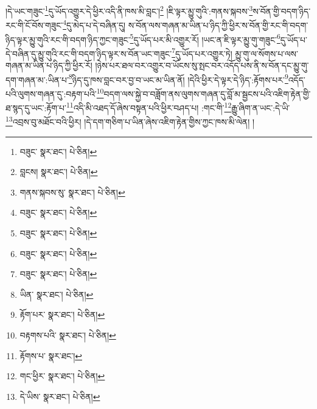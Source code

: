 །དེ་ཡང་གཟུང་\footnote{བཟུང་  སྣར་ཐང་།  པེ་ཅིན། }དུ་ཡོད་འགྱུར་དེ་ཕྱིར་འདི་ནི་ཁས་མི་བླང་།\footnote{བླངས།  སྣར་ཐང་།  པེ་ཅིན། } །ཇི་ལྟར་མྱུ་གུའི་:གནས་སྐབས་\footnote{གནས་སྐབས་སུ་  སྣར་ཐང་།  པེ་ཅིན། }ས་བོན་གྱི་བདག་ཉིད་རང་གི་ངོ་བོས་གཟུང་\footnote{བཟུང་  སྣར་ཐང་།  པེ་ཅིན། }དུ་མེད་པ་དེ་བཞིན་དུ། ས་བོན་ལས་གཞན་མ་ཡིན་པ་ཉིད་ཀྱི་ཕྱིར་ས་བོན་གྱི་རང་གི་བདག་ཉིད་ལྟར་མྱུ་གུའི་རང་གི་བདག་ཉིད་ཀྱང་གཟུང་\footnote{བཟུང་  སྣར་ཐང་།  པེ་ཅིན། }དུ་ཡོད་པར་མི་འགྱུར་རོ། །ཡང་ན་ཇི་ལྟར་མྱུ་གུ་གཟུང་\footnote{བཟུང་  སྣར་ཐང་།  པེ་ཅིན། }དུ་ཡོད་པ་དེ་བཞིན་དུ་མྱུ་གུའི་རང་གི་བདག་ཉིད་ལྟར་ས་བོན་ཡང་གཟུང་\footnote{བཟུང་  སྣར་ཐང་།  པེ་ཅིན། }དུ་ཡོད་པར་འགྱུར་ཏེ། མྱུ་གུ་ལ་སོགས་པ་ལས་གཞན་མ་ཡིན་པ་ཉིད་ཀྱི་ཕྱིར་རོ། །ཉེས་པར་ཐལ་བར་འགྱུར་བ་ཡོངས་སུ་སྤང་བར་འདོད་པས་ནི་ས་བོན་དང་མྱུ་གུ་དག་གཞན་མ་:ཡིན་པ་\footnote{ཡིན་  སྣར་ཐང་།  པེ་ཅིན། }ཉིད་དུ་ཁས་བླང་བར་བྱ་བ་ཡང་མ་ཡིན་ནོ། །དེའི་ཕྱིར་དེ་ལྟར་དེ་ཉིད་:རྟོགས་པར་\footnote{རྟོག་པར་  སྣར་ཐང་།  པེ་ཅིན། }འདོད་པའི་ལུགས་གཞན་དུ་:བརྟག་པའི་\footnote{བརྟགས་པའི་  སྣར་ཐང་།  པེ་ཅིན། }བདག་ལས་སྐྱེ་བ་བཟློག་ནས་ལུགས་གཞན་དུ་བློ་མ་སྦྱངས་པའི་འཇིག་རྟེན་གྱི་ཐ་སྙད་དུ་ཡང་:རྟོག་པ་\footnote{རྟོགས་པ་  སྣར་ཐང་། }འདི་མི་འཐད་དོ་ཞེས་བསྟན་པའི་ཕྱིར་བཤད་པ། :གང་གི་\footnote{གང་ཕྱིར་  སྣར་ཐང་།  པེ་ཅིན། }རྒྱུ་ཞིག་ན་ཡང་:དེ་ཡི་\footnote{དེ་ཡིས་  སྣར་ཐང་།  པེ་ཅིན། }འབྲས་བུ་མཐོང་བའི་ཕྱིར། །དེ་དག་གཅིག་པ་ཡིན་ཞེས་འཇིག་རྟེན་གྱིས་ཀྱང་ཁས་མི་ལེན། །
